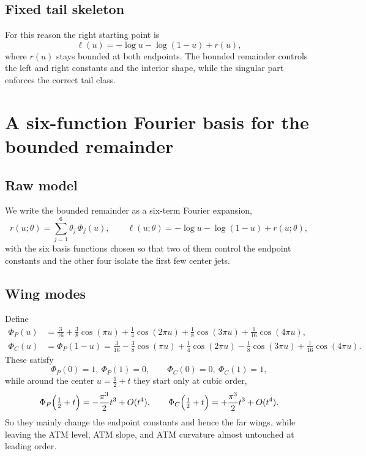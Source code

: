 \documentclass[11pt]{article}
\begin{document}
\subsection{Fixed tail skeleton}
For this reason the right starting point is
\begin{equation}
\ell(u) = -\log u - \log(1-u) + r(u),
\label{eq:lqd-skeleton}
\end{equation}
where $r(u)$ stays bounded at both endpoints. The bounded remainder controls the left and right constants and the interior shape, while the singular part enforces the correct tail class.

\section{A six-function Fourier basis for the bounded remainder}
\subsection{Raw model}
We write the bounded remainder as a six-term Fourier expansion,
\begin{equation}
r(u;\theta) = \sum_{j=1}^6 \theta_j \, \Phi_j(u),
\qquad
\ell(u;\theta) = -\log u - \log(1-u) + r(u;\theta),
\label{eq:raw-lqd-model}
\end{equation}
with the six basis functions chosen so that two of them control the endpoint constants and the other four isolate the first few center jets.

\subsection{Wing modes}
Define
\begin{align}
\Phi_P(u)
&= \frac{3}{16} + \frac{3}{8}\cos(\pi u) + \frac{1}{4}\cos(2\pi u)
   + \frac{1}{8}\cos(3\pi u) + \frac{1}{16}\cos(4\pi u),
\label{eq:PhiP}\\
\Phi_C(u)
&= \Phi_P(1-u)
 = \frac{3}{16} - \frac{3}{8}\cos(\pi u) + \frac{1}{4}\cos(2\pi u)
   - \frac{1}{8}\cos(3\pi u) + \frac{1}{16}\cos(4\pi u).
\label{eq:PhiC}
\end{align}
These satisfy
\[
\Phi_P(0)=1,\ \Phi_P(1)=0,
\qquad
\Phi_C(0)=0,\ \Phi_C(1)=1,
\]
while around the center $u = \tfrac12 + t$ they start only at cubic order,
\[
\Phi_P\Bigl(\tfrac12+t\Bigr) = -\frac{\pi^3}{2}t^3 + O(t^4),
\qquad
\Phi_C\Bigl(\tfrac12+t\Bigr) = +\frac{\pi^3}{2}t^3 + O(t^4).
\]
So they mainly change the endpoint constants and hence the far wings, while leaving the ATM level, ATM slope, and ATM curvature almost untouched at leading order.
\end{document}
